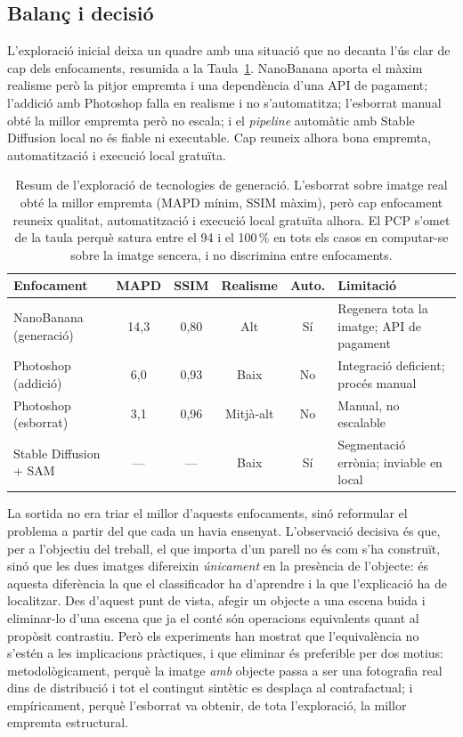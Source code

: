 \subsection{Balanç i decisió} \label{sec:estrategia}
L'exploració inicial deixa un quadre amb una situació que no decanta l'ús clar de cap dels enfocaments, resumida a la Taula~\ref{tab:estrategia}. NanoBanana aporta el màxim realisme però la pitjor empremta i una dependència d'una \ac{API} de pagament; l'addició amb Photoshop falla en realisme i no s'automatitza; l'esborrat manual obté la millor empremta però no escala; i el \emph{pipeline} automàtic amb Stable Diffusion local no és fiable ni executable. Cap reuneix alhora bona empremta, automatització i execució local gratuïta.

\begin{table}
\centering
\begin{tabularx}{\textwidth}{@{} l c c c c X @{}}
\toprule
\textbf{Enfocament} & \textbf{\acs{MAPD}} & \textbf{\acs{SSIM}} & \textbf{Realisme} & \textbf{Auto.} & \textbf{Limitació} \\
\midrule
NanoBanana (generació)       & 14,3 & 0,80 & Alt       & Sí  & Regenera tota la imatge; \ac{API} de pagament \\
\addlinespace
Photoshop (addició)          & 6,0  & 0,93 & Baix      & No  & Integració deficient; procés manual \\
\addlinespace
Photoshop (esborrat)         & 3,1  & 0,96 & Mitjà-alt & No  & Manual, no escalable \\
\addlinespace
Stable Diffusion + \acs{SAM} & --- & --- & Baix & Sí  & Segmentació errònia; inviable en local \\
\bottomrule
\end{tabularx}
\caption{Resum de l'exploració de tecnologies de generació. L'esborrat sobre imatge real obté la millor empremta (\acs{MAPD} mínim, \acs{SSIM} màxim), però cap enfocament reuneix qualitat, automatització i execució local gratuïta alhora. El \acs{PCP} s'omet de la taula perquè satura entre el 94 i el 100\,\% en tots els casos en computar-se sobre la imatge sencera, i no discrimina entre enfocaments.}
\label{tab:estrategia}
\end{table}

La sortida no era triar el millor d'aquests enfocaments, sinó reformular el problema a partir del que cada un havia ensenyat. L'observació decisiva és que, per a l'objectiu del treball, el que importa d'un parell no és com s'ha construït, sinó que les dues imatges difereixin \emph{únicament} en la presència de l'objecte: és aquesta diferència la que el classificador ha d'aprendre i la que l'explicació ha de localitzar. Des d'aquest punt de vista, afegir un objecte a una escena buida i eliminar-lo d'una escena que ja el conté són operacions equivalents quant al propòsit contrastiu. Però els experiments han mostrat que l'equivalència no s'estén a les implicacions pràctiques, i que eliminar és preferible per dos motius: metodològicament, perquè la imatge \emph{amb} objecte passa a ser una fotografia real dins de distribució i tot el contingut sintètic es desplaça al contrafactual; i empíricament, perquè l'esborrat va obtenir, de tota l'exploració, la millor empremta estructural.

